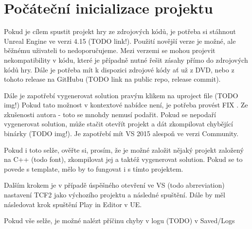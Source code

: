 
\section{Počáteční inicializace projektu}

Pokud je cílem spustit projekt hry ze zdrojových kódů, je potřeba si stáhnout Unreal Engine ve verzi 4.15 (TODO link!). Použití novější verze je možné, ale běžnému uživateli to nedoporučujeme. Mezi verzemi se mohou projevit nekompatibility v kódu, které je případně nutné řešit zásahy přímo do zdrojových kódů hry.
Dále je potřeba mít k dispozici zdrojové kódy ať už z DVD, nebo z tohoto release na GitHubu (TODO link na public repo, release commit).

Dále je zapotřebí vygenerovat solution pravým klikem na uproject file (TODO img!) Pokud tato možnost v kontextové nabídce není, je potřeba provést FIX . Ze zkušenosti autora - toto se mnohdy nemusí podařit. Pokud se nepodaří vygenerovat solution, může stačit otevřít projekt a dát zkompilovat chybějící binárky (TODO img!). Je zapotřebí mít VS 2015 alespoň ve verzi Community.

Pokud i toto selže, ověřte si, prosím, že je možné založit nějaký projekt založený na C++ (todo font), zkompilovat jej a taktéž vygenerovat solution. Pokud se to povede s template, mělo by to fungovat i s tímto projektem.


Dalším krokem je v případě úspěšného otevření ve VS (todo abrreviation) nastavení TCF2 jako výchozího projektu a následné spuštění. Dále by měl následovat krok spuštění Play in Editor v UE.


Pokud vše selže, je možné nalézt příčinu chyby v logu (TODO) v Saved/Logs


